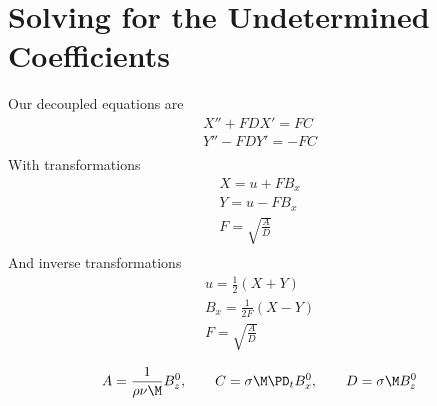 \documentclass[11pt]{article}
\begin{document}
\doublespacing
\MOONSTITLE
\maketitle

\section{Solving for the Undetermined Coefficients}
Our decoupled equations are
\begin{equation}\begin{aligned}
X'' + F D X' =   FC \\
Y'' - F D Y' = - FC \\
\end{aligned} \end{equation}
With transformations
\begin{equation}\begin{aligned}
X = u + F B_x \\
Y = u - F B_x \\
F = \sqrt{\frac{A}{D}} \\
\end{aligned} \end{equation}
And inverse transformations
\begin{equation}\begin{aligned}
u   = \frac{1}{2} \left( X + Y \right) \\
B_x = \frac{1}{2F} \left( X - Y \right) \\
F = \sqrt{\frac{A}{D}} \\
\end{aligned} \end{equation}
\begin{equation}\begin{aligned}
A = \frac{1}{\rho \nu \M} B_z^0, \qquad
C = \sigma \M \PD_t B_x^0, \qquad
D = \sigma \M B_z^0
\end{aligned} \end{equation}
\end{document}
